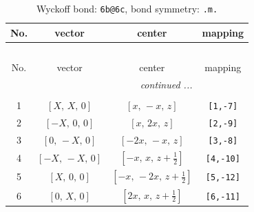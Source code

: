 \documentclass[fleqn,8pt]{jsarticle}
\begin{document}
\begin{longtable}{cccc}
\caption{Wyckoff bond: {\tt 6b@6c}, bond symmetry: {\tt .m.}}
 \\
 \hline \hline
No. & vector & center & mapping \\ \hline \endfirsthead

\multicolumn{3}{l}{\tablename\ \thetable{}} \\
 \hline \hline
No. & vector & center & mapping \\ \hline \endhead

 \hline \hline
\multicolumn{3}{r}{\footnotesize\it continued ...} \\ \endfoot

 \hline \hline
\multicolumn{3}{r}{} \\ \endlastfoot

1 & $\left[ X,\, X,\, 0 \right]$ & $\left[ x,\, - x,\, z \right]$ & {\tt [1,-7]} \\ \hline
2 & $\left[ - X,\, 0,\, 0 \right]$ & $\left[ x,\, 2 x,\, z \right]$ & {\tt [2,-9]} \\ \hline
3 & $\left[ 0,\, - X,\, 0 \right]$ & $\left[ - 2 x,\, - x,\, z \right]$ & {\tt [3,-8]} \\ \hline
4 & $\left[ - X,\, - X,\, 0 \right]$ & $\left[ - x,\, x,\, z + \frac{1}{2} \right]$ & {\tt [4,-10]} \\ \hline
5 & $\left[ X,\, 0,\, 0 \right]$ & $\left[ - x,\, - 2 x,\, z + \frac{1}{2} \right]$ & {\tt [5,-12]} \\ \hline
6 & $\left[ 0,\, X,\, 0 \right]$ & $\left[ 2 x,\, x,\, z + \frac{1}{2} \right]$ & {\tt [6,-11]} \\
\end{longtable}
\renewcommand{\arraystretch}{1.2}
\end{document}

